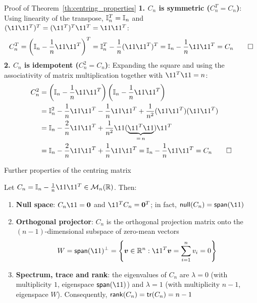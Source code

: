 \documentclass[aspectratio=169]{beamer}\usepackage[]{graphicx}\usepackage[]{xcolor}
\begin{document}
\begin{frame}[importantcolour]{Proof of Theorem~\ref{th:centring_properties}}
\textbf{1. $C_n$ is symmetric ($C_n^T = C_n$)}:
Using linearity of the transpose, $\mathbb{I}_n^T = \mathbb{I}_n$ and $(\11\11^T)^T = (\11^T)^T \11^T = \11\11^T$:
\[
C_n^T = \left(\II_n - \frac{1}{n}\11\11^T\right)^T = \II_n^T - \frac{1}{n}(\11\11^T)^T = \II_n - \frac{1}{n}\11\11^T = C_n \hfill\qed
\]
\vfill
\textbf{2. $C_n$ is idempotent ($C_n^2 = C_n$)}:
Expanding the square and using the associativity of matrix multiplication together with $\11^T\11 = n$:
\begin{align*}
C_n^2 &= \left(\II_n - \frac{1}{n}\11\11^T\right)\left(\II_n - \frac{1}{n}\11\11^T\right) \\
&= \II_n^2 - \frac{1}{n}\11\11^T - \frac{1}{n}\11\11^T + \frac{1}{n^2}(\11\11^T)(\11\11^T) \\
&= \II_n - \frac{2}{n}\11\11^T + \frac{1}{n^2}\11(\underbrace{\11^T\11}_{=\,n})\11^T \\
&= \II_n - \frac{2}{n}\11\11^T + \frac{1}{n}\11\11^T = \II_n - \frac{1}{n}\11\11^T = C_n \hfill\qed
\end{align*}
\end{frame}

\begin{frame}{Further properties of the centring matrix}
\begin{theorem}
\label{th:centring_further_properties}
Let $C_n = \II_n - \frac{1}{n}\11\11^T \in \M_n(\IR)$. Then:
\begin{enumerate}
\item \textbf{Null space}: $C_n\11 = \b0$ and $\11^T C_n = \b0^T$; in fact, $\nullspace(C_n) = \Span(\11)$
\item \textbf{Orthogonal projector}: $C_n$ is the orthogonal projection matrix onto the $(n-1)$-dimensional subspace of zero-mean vectors
\[
W = \Span(\11)^\perp = \left\{\bv\in\IR^n : \11^T\bv = \sum_{i=1}^n v_i = 0\right\}
\]
\item \textbf{Spectrum, trace and rank}: the eigenvalues of $C_n$ are $\lambda = 0$ (with multiplicity $1$, eigenspace $\Span(\11)$) and $\lambda = 1$ (with multiplicity $n-1$, eigenspace $W$). Consequently, $\mathsf{rank}(C_n) = \mathsf{tr}(C_n) = n-1$
\end{enumerate}
\end{theorem}
\end{frame}
\end{document}
